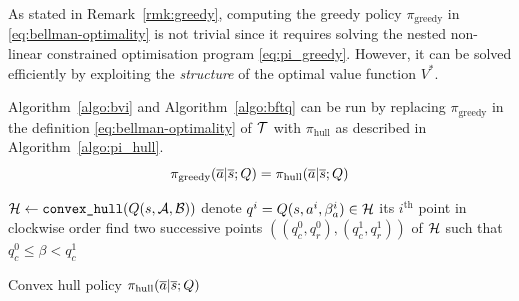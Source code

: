 \documentclass{article}
\begin{document}
As stated in Remark~\ref{rmk:greedy}, computing the greedy policy $\pi_\text{greedy}$ in \eqref{eq:bellman-optimality} is not trivial since it requires solving the nested non-linear constrained optimisation program \eqref{eq:pi_greedy}. However, it can be solved efficiently by exploiting the \emph{structure} of the optimal value function $V^*$. %




\begin{proposition}
\label{prop:bftq_pi_hull}
Algorithm~\ref{algo:bvi} and Algorithm~\ref{algo:bftq} can be run by replacing $\pi_\text{greedy}$ in the definition \eqref{eq:bellman-optimality} of $\mathcal{T}$ with $\pi_\text{hull}$ as described in Algorithm~\ref{algo:pi_hull}.
\begin{equation*}
    \pi_\text{greedy}(\overline{a}|\overline{s}; Q) = \pi_\text{hull}(\overline{a}|\overline{s}; Q)
\end{equation*}
\end{proposition}

\begin{algorithm}
\DontPrintSemicolon
{}
$\mathcal{H} \leftarrow \texttt{convex\_hull}(Q(s,\mathcal{A}, \mathcal{B}))$\;
denote $q^i = Q(s,a^i,\beta_a^i)\in\mathcal{H}$ its $i^{\text{th}}$ point in clockwise order\;
find two successive points $((q_c^0, q_r^0), (q_c^1, q_r^1))$ of $\mathcal{H}$ such that $q_c^0 \leq \beta < q_c^1$\;
\caption{Convex hull policy $\pi_\text{hull}(\overline{a}|\overline{s}; Q)$}
\label{algo:pi_hull}
\end{algorithm}
\end{document}
